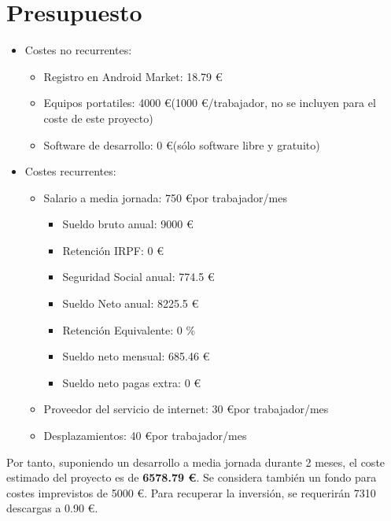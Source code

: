 \section{Presupuesto}

\begin{itemize}

  \item Costes no recurrentes:

  \begin{itemize}
    \item Registro en Android Market: 18.79 \euro
    \item Equipos portatiles: 4000 \euro (1000 \euro/trabajador, no se incluyen
      para el coste de este proyecto)
    \item Software de desarrollo: 0 \euro (sólo software libre y gratuito)
  \end{itemize}

  \item Costes recurrentes:

  \begin{itemize}

    \item Salario a media jornada: 750 \euro por trabajador/mes

    \begin{itemize}
      \item Sueldo bruto anual: 9000 \euro
      \item Retención IRPF: 0 \euro
      \item Seguridad Social anual: 774.5 \euro
      \item Sueldo Neto anual: 8225.5 \euro
      \item Retención Equivalente: 0 \%
      \item Sueldo neto mensual: 685.46 \euro
      \item Sueldo neto pagas extra: 0 \euro
    \end{itemize}

    \item Proveedor del servicio de internet: 30 \euro por trabajador/mes
    \item Desplazamientos: 40 \euro por trabajador/mes

  \end{itemize}

\end{itemize}

Por tanto, suponiendo un desarrollo a media jornada durante 2 meses, el coste
estimado del proyecto es de {\bf 6578.79 \euro}. Se considera también un fondo
para costes imprevistos de 5000 \euro. Para recuperar la inversión, se
requerirán 7310 descargas a 0.90 \euro.
